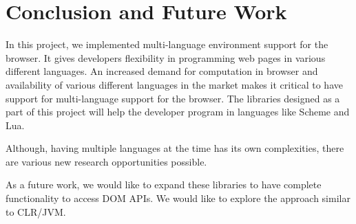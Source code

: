 \chapter{Conclusion and Future Work}

In this project, we implemented multi-language environment support for the browser.
 It gives developers flexibility in programming web pages in various different languages. An increased demand for computation in browser and availability of various different languages in the market makes it critical to have support for multi-language support for the browser. The libraries designed as a part of this project will help the developer program in languages like Scheme and Lua. 
 
 Although, having multiple languages at the time has its own complexities, there are various new research opportunities possible. 

As a future work, we would like to expand these libraries to have complete functionality to access DOM APIs. We would like to explore the approach similar to CLR/JVM.
